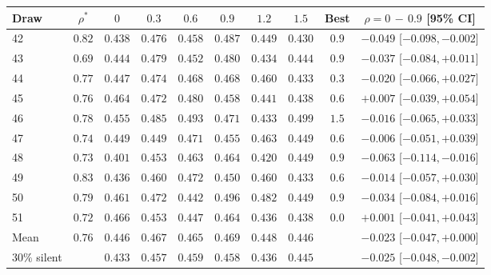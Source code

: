 \begin{tabular}{lccccccccc}
\toprule
Draw & $\rho^\ast$ & $0$ & $0.3$ & $0.6$ & $0.9$ & $1.2$ & $1.5$ & Best & $\rho{=}0$ $-$ $0.9$ [95\% CI] \\
\midrule
42 & $0.82$ & $0.438$ & $0.476$ & $0.458$ & $0.487$ & $0.449$ & $0.430$ & $0.9$ & $-0.049$ [$-0.098,-0.002$] \\
43 & $0.69$ & $0.444$ & $0.479$ & $0.452$ & $0.480$ & $0.434$ & $0.444$ & $0.9$ & $-0.037$ [$-0.084,+0.011$] \\
44 & $0.77$ & $0.447$ & $0.474$ & $0.468$ & $0.468$ & $0.460$ & $0.433$ & $0.3$ & $-0.020$ [$-0.066,+0.027$] \\
45 & $0.76$ & $0.464$ & $0.472$ & $0.480$ & $0.458$ & $0.441$ & $0.438$ & $0.6$ & $+0.007$ [$-0.039,+0.054$] \\
46 & $0.78$ & $0.455$ & $0.485$ & $0.493$ & $0.471$ & $0.433$ & $0.499$ & $1.5$ & $-0.016$ [$-0.065,+0.033$] \\
47 & $0.74$ & $0.449$ & $0.449$ & $0.471$ & $0.455$ & $0.463$ & $0.449$ & $0.6$ & $-0.006$ [$-0.051,+0.039$] \\
48 & $0.73$ & $0.401$ & $0.453$ & $0.463$ & $0.464$ & $0.420$ & $0.449$ & $0.9$ & $-0.063$ [$-0.114,-0.016$] \\
49 & $0.83$ & $0.436$ & $0.460$ & $0.472$ & $0.450$ & $0.460$ & $0.433$ & $0.6$ & $-0.014$ [$-0.057,+0.030$] \\
50 & $0.79$ & $0.461$ & $0.472$ & $0.442$ & $0.496$ & $0.482$ & $0.449$ & $0.9$ & $-0.034$ [$-0.084,+0.016$] \\
51 & $0.72$ & $0.466$ & $0.453$ & $0.447$ & $0.464$ & $0.436$ & $0.438$ & $0.0$ & $+0.001$ [$-0.041,+0.043$] \\
\midrule
Mean & $0.76$ & $0.446$ & $0.467$ & $0.465$ & $0.469$ & $0.448$ & $0.446$ & & $-0.023$ [$-0.047,+0.000$] \\
$30\%$ silent & & $0.433$ & $0.457$ & $0.459$ & $0.458$ & $0.436$ & $0.445$ & & $-0.025$ [$-0.048,-0.002$] \\
\bottomrule
\end{tabular}

